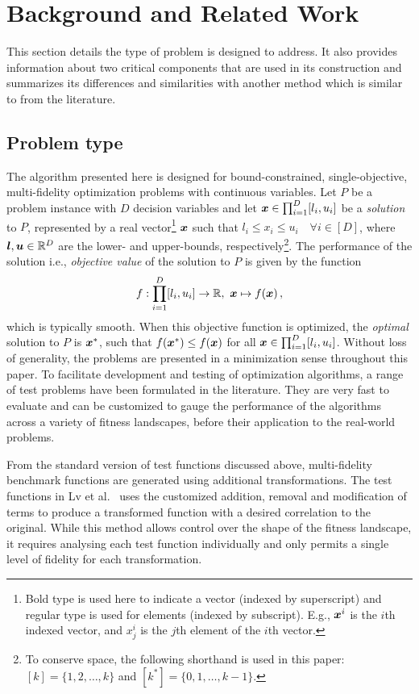 \section{Background and Related Work}\label{sec:back}
This section details the type of problem \AlgName{} is designed to address. It also provides information about two critical components that are used in its construction and summarizes its differences and similarities with another method which is similar to \AlgName{} from the literature.

\subsection{Problem type}
The algorithm presented here is designed for bound-constrained, single-objective, multi-fidelity optimization problems with continuous variables. Let $P$ be a problem instance with $D$ decision variables and let $\boldsymbol{x} \in \prod^D_{i=1}[l_i,u_i]$ be a \emph{solution} to $P$, represented by a real vector\footnote{Bold type is used here to indicate a vector (indexed by superscript) and regular type is used for elements (indexed by subscript). E.g., $\boldsymbol{x}^i$ is the $i$th indexed vector, and $x_j^i$ is the $j$th element of the $i$th vector.} $\boldsymbol{x}$ such that $l_i \le x_i \le u_i \quad \forall {i \in [D]}$, where $\boldsymbol{l},\boldsymbol{u} \in \mathbb{R}^D$ are the lower- and upper-bounds, respectively\footnote{To conserve space, the following shorthand is used in this paper: ${[k] = \{1,2,\dots,k\}}$ and $[k^*] = \{0,1,\dots,k-1\}$.}. The performance of the solution i.e., \emph{objective value} of the solution to $P$ is given by the function
\begin{equation}
f:\displaystyle\prod^D_{i=1}[l_i,u_i]\to \mathbb{R},\ \boldsymbol{x} \mapsto f(\boldsymbol{x})\,, \label{eq:objective}
\end{equation}
which is typically smooth. When this objective function is optimized, the \emph{optimal} solution to $P$ is $\boldsymbol{x}^*$, such that $f(\boldsymbol{x}^*) \leq f(\boldsymbol{x})$ for all $\boldsymbol{x} \in \prod^D_{i=1}[l_i,u_i]$. Without loss of generality, the problems are presented in a minimization sense throughout this paper. 
To facilitate development and testing of optimization algorithms, a range of test problems have been formulated in the literature. They are very fast to evaluate and can be customized to gauge the performance of the algorithms across a variety of fitness landscapes, before their application to the real-world problems.

From the standard version of test functions discussed above, multi-fidelity benchmark functions are generated using additional transformations. The test functions in Lv et al.~\cite{lv2021multi} uses the customized addition, removal and modification of terms to produce a transformed function with a desired correlation to the original. While this method allows control over the shape of the fitness landscape, it requires analysing each test function individually and only permits a single level of fidelity for each transformation.

